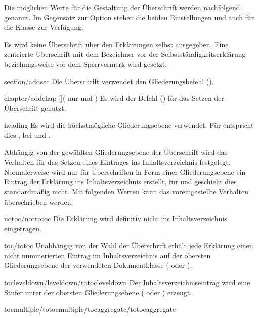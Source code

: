 \begin{Declaration*}{}
\begin{Declaration*}{}
\begin{Declaration*}{}
\begin{Declaration}
Die möglichen Werte für die Gestaltung der Überschrift werden nachfolgend 
genannt. Im Gegensatz zur Option  stehen die beiden 
Einstellungen  und  auch für 
die Klasse  zur Verfügung.
%
\begin{values}{}
\itemfalse
  Es wird keine Überschrift über den Erklärungen selbst ausgegeben.
\itemtrue*
  Eine zentrierte Überschrift mit dem Bezeichner  vor 
  der Selbstständigkeitserklärung beziehungsweise  vor dem 
  Sperrvermerk wird gesetzt. 
\item[section/addsec]
  Die Überschrift verwendet den Gliederungsbefehl 
  ().
\item[chapter/addchap][\Class{tudscrbook}](%
    nur  und %
  )
  Es wird der Befehl () für das Setzen der 
  Überschrift genutzt. 
\item[heading]
  Es wird die höchstmögliche Gliederungsebene verwendet. Für 
   entspricht dies , bei 
   und  .
\end{values}
%
Abhängig von der gewählten Gliederungsebene der Überschrift wird das Verhalten 
für das Setzen eines Eintrages ins Inhaltsverzeichnis festgelegt. Normalerweise 
wird nur für Überschriften in Form einer Gliederungsebene ein Eintrag der 
Erklärung ins Inhaltsverzeichnis erstellt, für  und 
 geschieht dies standardmäßig nicht. Mit folgenden 
Werten kann das voreingestellte Verhalten überschrieben werden.
%
\begin{values}{}
\item[notoc/nottotoc]
  Die Erklärung wird definitiv nicht ins Inhaltsverzeichnis eingetragen.
\item[toc/totoc]
  Unabhängig von der Wahl der Überschrift erhält jede Erklärung einen nicht
  nummerierten Eintrag im Inhaltsverzeichnis auf der obersten Gliederungsebene 
  der verwendeten Dokumentklasse ( oder ). 
\item[tocleveldown/leveldown/totocleveldown]
  Der Inhaltsverzeichniseintrag wird eine Stufer unter der obersten 
  Gliederungsebene ( oder ) erzeugt.
\item[tocmultiple/totocmultiple/tocaggregate/totocaggregate]

\end{values}
\end{Declaration}
\end{Declaration*}
\end{Declaration*}
\end{Declaration*}
